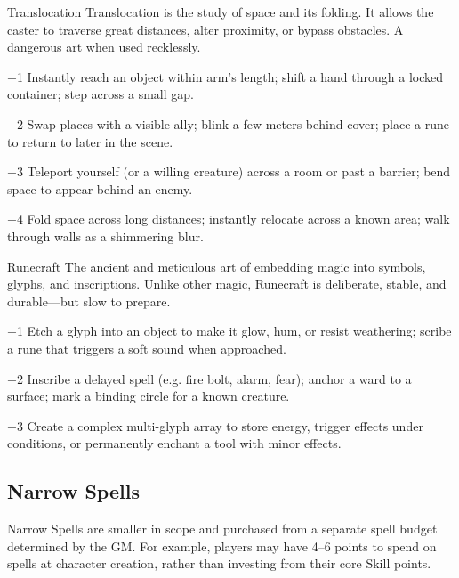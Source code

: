 \begin{WyrdSpell}[Conjuration]{Translocation}
    Translocation is the study of space and its folding. It allows the caster to traverse great distances, alter proximity, or bypass obstacles. A dangerous art when used recklessly.

    \begin{WyrdSpellBlock}
        \item[+1] Instantly reach an object within arm’s length; shift a hand through a locked container; step across a small gap.
        \item[+2] Swap places with a visible ally; blink a few meters behind cover; place a rune to return to later in the scene.
        \item[+3] Teleport yourself (or a willing creature) across a room or past a barrier; bend space to appear behind an enemy.
        \item[+4] Fold space across long distances; instantly relocate across a known area; walk through walls as a shimmering blur.
    \end{WyrdSpellBlock}
\end{WyrdSpell}

\begin{WyrdSpell}[Runes]{Runecraft}
    The ancient and meticulous art of embedding magic into symbols, glyphs, and inscriptions. Unlike other magic, Runecraft is deliberate, stable, and durable—but slow to prepare.

    \begin{WyrdSpellBlock}
        \item[+1] Etch a glyph into an object to make it glow, hum, or resist weathering; scribe a rune that triggers a soft sound when approached.
        \item[+2] Inscribe a delayed spell (e.g. fire bolt, alarm, fear); anchor a ward to a surface; mark a binding circle for a known creature.
        \item[+3] Create a complex multi-glyph array to store energy, trigger effects under conditions, or permanently enchant a tool with minor effects.
    \end{WyrdSpellBlock}
\end{WyrdSpell}

\subsection{Narrow Spells}

Narrow Spells are smaller in scope and purchased from a separate spell budget determined by the GM. For example, players may have 4–6 points to spend on spells at character creation, rather than investing from their core Skill points.

